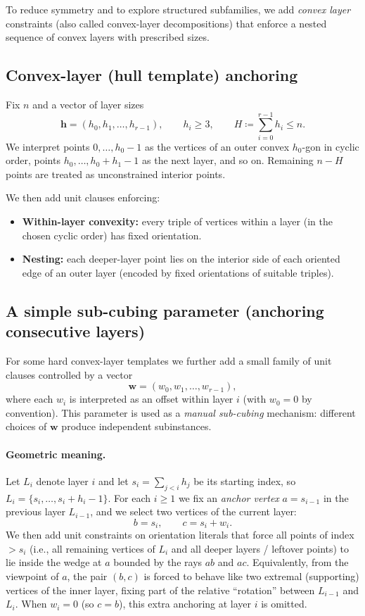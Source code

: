 \documentclass[11pt,a4paper]{article}
\theoremstyle{definition}
\begin{document}
To reduce symmetry and to explore structured subfamilies, we add \emph{convex layer} constraints (also called convex-layer decompositions) that enforce a nested sequence of convex layers with prescribed sizes.

\subsection{Convex-layer (hull template) anchoring}

Fix $n$ and a vector of layer sizes
\[
\mathbf{h} = (h_0,h_1,\dots,h_{r-1}),\qquad h_i\ge 3,\qquad H\coloneqq \sum_{i=0}^{r-1} h_i \le n.
\]
We interpret points $0,\dots,h_0-1$ as the vertices of an outer convex $h_0$-gon in cyclic order, points $h_0,\dots,h_0+h_1-1$ as the next layer, and so on. Remaining $n-H$ points are treated as unconstrained interior points.

We then add unit clauses enforcing:
\begin{itemize}
\item \textbf{Within-layer convexity:} every triple of vertices within a layer (in the chosen cyclic order) has fixed orientation.
\item \textbf{Nesting:} each deeper-layer point lies on the interior side of each oriented edge of an outer layer (encoded by fixed orientations of suitable triples).
\end{itemize}

\subsection{A simple sub-cubing parameter (anchoring consecutive layers)}\label{subsec:subcubing}

For some hard convex-layer templates we further add a small family of unit clauses controlled by a vector
\[
\mathbf{w}=(w_0,w_1,\dots,w_{r-1}),
\]
where each $w_i$ is interpreted as an offset within layer $i$ (with $w_0=0$ by convention). This parameter is used as a \emph{manual sub-cubing} mechanism: different choices of $\mathbf{w}$ produce independent subinstances.

\paragraph{Geometric meaning.}
Let $L_i$ denote layer $i$ and let $s_i=\sum_{j<i} h_j$ be its starting index, so $L_i=\{s_i,\dots,s_i+h_i-1\}$.
For each $i\ge 1$ we fix an \emph{anchor vertex} $a=s_{i-1}$ in the previous layer $L_{i-1}$, and we select two vertices of the current layer:
\[
b=s_i,\qquad c=s_i+w_i.
\]
We then add unit constraints on orientation literals that force all points of index $>s_i$ (i.e., all remaining vertices of $L_i$ and all deeper layers / leftover points) to lie inside the wedge at $a$ bounded by the rays $ab$ and $ac$.
Equivalently, from the viewpoint of $a$, the pair $(b,c)$ is forced to behave like two extremal (supporting) vertices of the inner layer, fixing part of the relative ``rotation'' between $L_{i-1}$ and $L_i$.
When $w_i=0$ (so $c=b$), this extra anchoring at layer $i$ is omitted.
\end{document}
